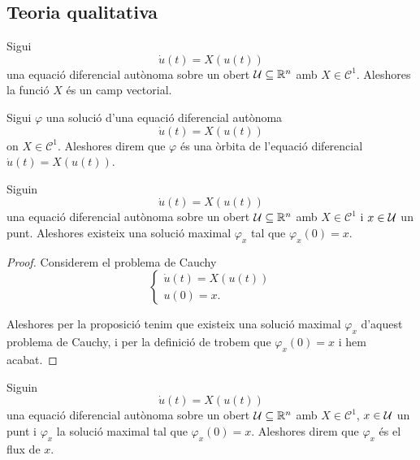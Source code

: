 \documentclass[../../Main.tex]{subfiles}
\begin{document}
	\subsection{Teoria qualitativa}
	\begin{observation}
		\label{obs:podem entendre les equacions diferencials autònomes com camps vectorials}
		Sigui
		\[\dot{u}(t)=X(u(t))\]
		una equació diferencial autònoma sobre un obert \(\mathcal{U}\subseteq\mathbb{R}^{n}\) amb \(X\in\mathcal{C}^{1}\). Aleshores la funció \(X\) és un camp vectorial.
	\end{observation}
	\begin{definition}[Òrbites]
		\label{def:òrbita d'una equació diferencial}
		Sigui \(\varphi\) una solució d'una equació diferencial autònoma
		\[\dot{u}(t)=X(u(t))\]
		on \(X\in\mathcal{C}^{1}\). Aleshores direm que \(\varphi\) és una òrbita de l'equació diferencial \(\dot{u}(t)=X(u(t))\).
%		
%		
	\end{definition}
	\begin{proposition}
		Siguin
		\[\dot{u}(t)=X(u(t))\]
		una equació diferencial autònoma sobre un obert \(\mathcal{U}\subseteq\mathbb{R}^{n}\) amb \(X\in\mathcal{C}^{1}\) i \(x\in\mathcal{U}\) un punt. Aleshores existeix una solució maximal \(\varphi_{x}\) tal que \(\varphi_{x}(0)=x\).
		\begin{proof}
			Considerem el problema de Cauchy
			\[\begin{cases*}
				\displaystyle \dot{u}(t)=X(u(t)) \\
				\displaystyle u(0)=x.
			\end{cases*}\]
			
			Aleshores per la proposició  tenim que existeix una solució maximal \(\varphi_{x}\) d'aquest problema de Cauchy, i per la definició de  trobem que \(\varphi_{x}(0)=x\) i hem acabat.
		\end{proof}
	\end{proposition}
	\begin{definition}[Flux]
		\label{def:flux}
		Siguin
		\[\dot{u}(t)=X(u(t))\]
		una equació diferencial autònoma sobre un obert \(\mathcal{U}\subseteq\mathbb{R}^{n}\) amb \(X\in\mathcal{C}^{1}\), \(x\in\mathcal{U}\) un punt i \(\varphi_{x}\) la solució maximal tal que \(\varphi_{x}(0)=x\). Aleshores direm que \(\varphi_{x}\) és el flux de \(x\).
	\end{definition}
	
	
\end{document}

